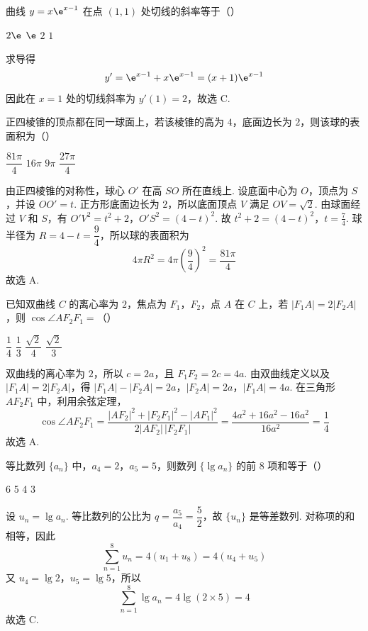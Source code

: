 \begin{problem}
曲线 \(y=x\e^{x-1}\) 在点 \(\left(1,1\right)\) 处切线的斜率等于（\quad）

\choices
    {\(2\e\)}
    {\(\e\)}
    {\(2\)}
    {\(1\)}

\begin{solution}
求导得
\[
y'=\e^{x-1}+x\e^{x-1}=(x+1)\e^{x-1}
\]
因此在 \(x=1\) 处的切线斜率为
\(y'(1)=2\)，故选 C.
\end{solution}
\end{problem}

\begin{problem}
正四棱锥的顶点都在同一球面上，若该棱锥的高为 \(4\)，底面边长为 \(2\)，则该球的表面积为（\quad）

\choices
    {\(\dfrac{81\pi}{4}\)}
    {\(16\pi\)}
    {\(9\pi\)}
    {\(\dfrac{27\pi}{4}\)}

\begin{solution}
由正四棱锥的对称性，球心 \(O'\) 在高 \(SO\) 所在直线上. 设底面中心为 \(O\)，顶点为 \(S\)，并设
\(OO'=t\). 正方形底面边长为 \(2\)，所以底面顶点 \(V\) 满足
\(OV=\sqrt{2}\). 由球面经过 \(V\) 和 \(S\)，有
\(O'V^{2}=t^{2}+2\)，\(O'S^{2}=(4-t)^{2}\).
故
\(t^{2}+2=(4-t)^{2}\)，\(t=\frac{7}{4}\).
球半径为 \(R=4-t=\dfrac{9}{4}\)，所以球的表面积为
\[
4\pi R^{2}=4\pi\left(\frac{9}{4}\right)^{2}=\frac{81\pi}{4}
\]
故选 A.
\end{solution}
\end{problem}

\begin{problem}
已知双曲线 \(C\) 的离心率为 \(2\)，焦点为 \(F_{1}\)，\(F_{2}\)，点 \(A\) 在 \(C\) 上，若 \(|F_{1}A|=2|F_{2}A|\)，则 \(\cos \angle AF_{2}F_{1}=\)（\quad）

\choices
    {\(\dfrac{1}{4}\)}
    {\(\dfrac{1}{3}\)}
    {\(\dfrac{\sqrt{2}}{4}\)}
    {\(\dfrac{\sqrt{2}}{3}\)}

\begin{solution}
双曲线的离心率为 \(2\)，所以 \(c=2a\)，且
\(F_{1}F_{2}=2c=4a\). 由双曲线定义以及
\(|F_{1}A|=2|F_{2}A|\)，得
\(|F_{1}A|-|F_{2}A|=2a\)，\(|F_{2}A|=2a\)，\(|F_{1}A|=4a\).
在三角形 \(AF_{2}F_{1}\) 中，利用余弦定理，
\[
\cos\angle AF_{2}F_{1}
=\frac{|AF_{2}|^{2}+|F_{2}F_{1}|^{2}-|AF_{1}|^{2}}
{2|AF_{2}|\,|F_{2}F_{1}|}
=\frac{4a^{2}+16a^{2}-16a^{2}}{16a^{2}}=\frac14
\]
故选 A.
\end{solution}
\end{problem}

\begin{problem}
等比数列 \(\{a_{n}\}\) 中，\(a_{4}=2\)，\(a_{5}=5\)，则数列 \(\{\lg a_{n}\}\) 的前 \(8\) 项和等于（\quad）

\choices
    {6}
    {5}
    {4}
    {3}

\begin{solution}
设 \(u_{n}=\lg a_{n}\). 等比数列的公比为
\(q=\dfrac{a_{5}}{a_{4}}=\dfrac52\)，故 \(\{u_{n}\}\) 是等差数列.
对称项的和相等，因此
\[
\sum_{n=1}^{8}u_{n}=4(u_{1}+u_{8})=4(u_{4}+u_{5})
\]
又 \(u_{4}=\lg2\)，\(u_{5}=\lg5\)，所以
\[
\sum_{n=1}^{8}\lg a_{n}=4\lg(2\times5)=4
\]
故选 C.
\end{solution}
\end{problem}

